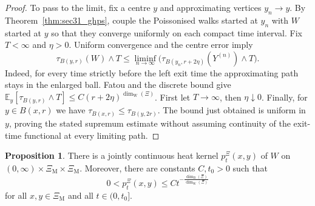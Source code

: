 \documentclass{article}
\theoremstyle{plain}
\theoremstyle{definition}
\newtheorem{proposition}[theorem]{Proposition}
\newcommand{\dimbox}{\dim_\mathrm{B}}
\newcommand{\dimwalk}{\dim_\mathrm{W}}
\begin{document}
\begin{proof}
To pass to the limit, fix a centre $y$ and approximating vertices
$y_n\to y$. By Theorem~\ref{thm:sec31_ghps}, couple the Poissonised
walks started at $y_n$ with $W$ started at $y$ so that they converge
uniformly on each compact time interval. Fix $T<\infty$ and $\eta>0$.
Uniform convergence and the centre error imply
\[
\tau_{B(y,r)}(W)\wedge T
\le\liminf_{n\to\infty}
\bigl(\tau_{B(y_n,r+2\eta)}(Y^{(n)})\wedge T\bigr).
\]
Indeed, for every time strictly before the left exit time the
approximating path stays in the enlarged ball. Fatou and the discrete
bound give $\mathbb E_y[\tau_{B(y,r)}\wedge T]
\le C(r+2\eta)^{\dimwalk(\Xi)}$.
First let $T\to\infty$, then $\eta\downarrow0$.
Finally, for $y\in B(x,r)$ we have
$\tau_{B(x,r)}\le\tau_{B(y,2r)}$. The bound just obtained is uniform
in $y$, proving the stated supremum estimate without assuming
continuity of the exit-time functional at every limiting path.
\end{proof}
\endgroup{}


\begin{proposition}\label{prop:heat-kernel}
There is a jointly continuous heat kernel $p_t^\Xi(x,y)$ of $W$ on $(0,\infty)\times \Xi_{\mathrm M}\times \Xi_{\mathrm M}$.
Moreover, there are constants $C,t_0>0$ such that
\[
0<p_t^\Xi(x,y)\le C t^{-\frac{\dimbox(\Xi)}{\dimwalk(\Xi)}}
\]
for all $x,y\in \Xi_{\mathrm M}$ and all $t\in(0,t_0]$.
\end{proposition}
\end{document}
